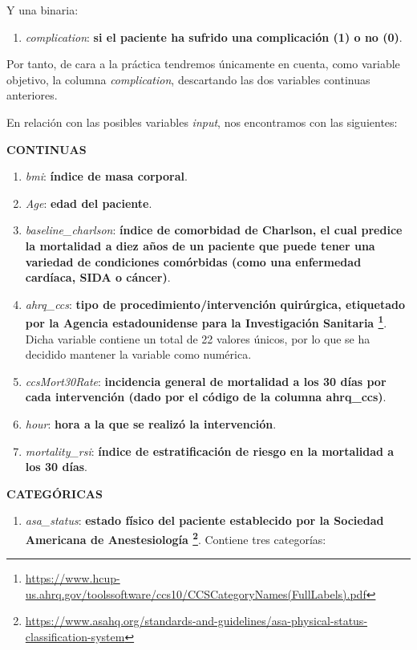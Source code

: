 \documentclass[
]{article}
\providecommand{\tightlist}{%
  \setlength{\itemsep}{0pt}\setlength{\parskip}{0pt}}
\begin{document}
Y una binaria:

\begin{enumerate}
\def\labelenumi{\arabic{enumi}.}
\setcounter{enumi}{2}
\tightlist
\item
  \emph{complication}: \textbf{si el paciente ha sufrido una
  complicación (1) o no (0)}.
\end{enumerate}

Por tanto, de cara a la práctica tendremos únicamente en cuenta, como
variable objetivo, la columna \emph{complication}, descartando las dos
variables continuas anteriores.

En relación con las posibles variables \emph{input}, nos encontramos con
las siguientes:

\textbf{CONTINUAS}

\begin{enumerate}
\def\labelenumi{\arabic{enumi}.}
\item
  \emph{bmi}: \textbf{índice de masa corporal}.
\item
  \emph{Age}: \textbf{edad del paciente}.
\item
  \emph{baseline\_charlson}: \textbf{índice de comorbidad de Charlson,
  el cual predice la mortalidad a diez años de un paciente que puede
  tener una variedad de condiciones comórbidas (como una enfermedad
  cardíaca, SIDA o cáncer)}.
\item
  \emph{ahrq\_ccs}: \textbf{tipo de procedimiento/intervención
  quirúrgica, etiquetado por la Agencia estadounidense para la
  Investigación Sanitaria \footnote{\url{https://www.hcup-us.ahrq.gov/toolssoftware/ccs10/CCSCategoryNames(FullLabels).pdf}}}.
  Dicha variable contiene un total de 22 valores únicos, por lo que se
  ha decidido mantener la variable como numérica.
\item
  \emph{ccsMort30Rate}: \textbf{incidencia general de mortalidad a los
  30 días por cada intervención (dado por el código de la columna
  ahrq\_ccs)}.
\item
  \emph{hour}: \textbf{hora a la que se realizó la intervención}.
\item
  \emph{mortality\_rsi}: \textbf{índice de estratificación de riesgo en
  la mortalidad a los 30 días}.
\end{enumerate}

\textbf{CATEGÓRICAS}

\begin{enumerate}
\def\labelenumi{\arabic{enumi}.}
\setcounter{enumi}{7}
\tightlist
\item
  \emph{asa\_status}: \textbf{estado físico del paciente establecido por
  la Sociedad Americana de Anestesiología \footnote{\url{https://www.asahq.org/standards-and-guidelines/asa-physical-status-classification-system}}}.
  Contiene tres categorías:
\end{enumerate}
\end{document}
